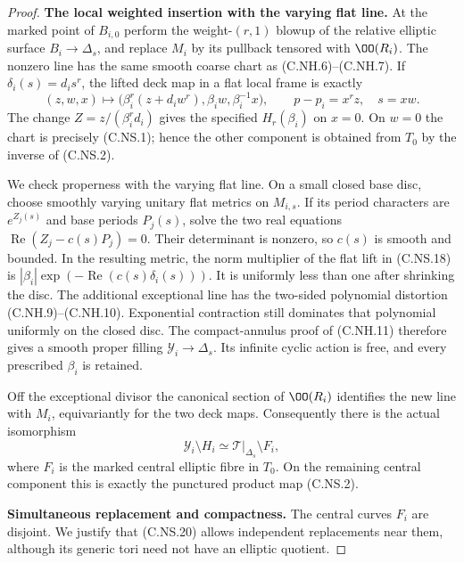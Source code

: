 \begin{proof}
\par\medskip\noindent\textbf{The local weighted insertion with the varying flat line.}
At the marked point of $B_{i,0}$ perform
the weight-$(r,1)$ blowup of the relative
elliptic surface $B_i\to\Delta_s$, and replace
$M_i$ by its pullback tensored with
$\OO(R_i)$. The nonzero line has the same
smooth coarse chart as (C.NH.6)--(C.NH.7).
If $\delta_i(s)=d_i s^r$, the lifted deck
map in a flat local frame is exactly
\[
 (z,w,x)\mapsto
   \bigl(\beta_i^r(z+d_iw^r),
              \beta_iw,\beta_i^{-1}x\bigr),
           \qquad p-p_i=x^rz,\quad s=xw.
                                                        \tag{C.NS.19}
\]
The change $Z=z/(\beta_i^r d_i)$ gives
the specified $H_r(\beta_i)$ on $x=0$.
On $w=0$ the chart is precisely (C.NS.1);
hence the other component is obtained
from $T_0$ by the inverse of (C.NS.2).

We check properness with the varying
flat line. On a small closed base disc,
choose smoothly varying unitary flat
metrics on $M_{i,s}$. If its period
characters are $e^{Z_j(s)}$ and base
periods $P_j(s)$, solve the two real
equations
$\operatorname{Re}(Z_j-c(s)P_j)=0$.
Their determinant is nonzero, so $c(s)$
is smooth and bounded. In the resulting
metric, the norm multiplier of the flat
lift in (C.NS.18) is
$|\beta_i|\exp(-\operatorname{Re}(c(s)\delta_i(s)))$.
It is uniformly less than one after
shrinking the disc. The additional
exceptional line has the two-sided
polynomial distortion (C.NH.9)--(C.NH.10).
Exponential contraction still dominates
that polynomial uniformly on the closed
disc. The compact-annulus proof of
(C.NH.11) therefore gives a smooth
proper filling $\mathcal Y_i\to\Delta_s$.
Its infinite cyclic action is free,
and every prescribed $\beta_i$ is
retained.

Off the exceptional divisor the canonical
section of $\OO(R_i)$ identifies the new
line with $M_i$, equivariantly for the
two deck maps. Consequently there is
the actual isomorphism
\[
       \mathcal Y_i\setminus H_i
            \simeq \mathcal T|_{\Delta_s}\setminus F_i,
                                                        \tag{C.NS.20}
\]
where $F_i$ is the marked central
elliptic fibre in $T_0$. On the remaining
central component this is exactly the
punctured product map (C.NS.2).

\par\medskip\noindent\textbf{Simultaneous replacement and compactness.}
The central curves $F_i$ are disjoint.
We justify that (C.NS.20) allows
independent replacements near them,
although its generic tori need not
have an elliptic quotient.


\end{proof}
